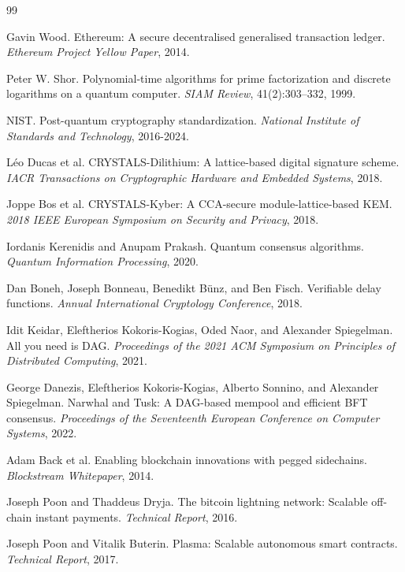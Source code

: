\documentclass[11pt]{article}
\begin{document}

\begin{thebibliography}{99}

Gavin Wood.
\newblock Ethereum: A secure decentralised generalised transaction ledger.
\newblock \emph{Ethereum Project Yellow Paper}, 2014.

Peter W. Shor.
\newblock Polynomial-time algorithms for prime factorization and discrete logarithms on a quantum computer.
\newblock \emph{SIAM Review}, 41(2):303--332, 1999.

NIST.
\newblock Post-quantum cryptography standardization.
\newblock \emph{National Institute of Standards and Technology}, 2016-2024.

Léo Ducas et al.
\newblock CRYSTALS-Dilithium: A lattice-based digital signature scheme.
\newblock \emph{IACR Transactions on Cryptographic Hardware and Embedded Systems}, 2018.

Joppe Bos et al.
\newblock CRYSTALS-Kyber: A CCA-secure module-lattice-based KEM.
\newblock \emph{2018 IEEE European Symposium on Security and Privacy}, 2018.

Iordanis Kerenidis and Anupam Prakash.
\newblock Quantum consensus algorithms.
\newblock \emph{Quantum Information Processing}, 2020.

Dan Boneh, Joseph Bonneau, Benedikt Bünz, and Ben Fisch.
\newblock Verifiable delay functions.
\newblock \emph{Annual International Cryptology Conference}, 2018.

Idit Keidar, Eleftherios Kokoris-Kogias, Oded Naor, and Alexander Spiegelman.
\newblock All you need is DAG.
\newblock \emph{Proceedings of the 2021 ACM Symposium on Principles of Distributed Computing}, 2021.

George Danezis, Eleftherios Kokoris-Kogias, Alberto Sonnino, and Alexander Spiegelman.
\newblock Narwhal and Tusk: A DAG-based mempool and efficient BFT consensus.
\newblock \emph{Proceedings of the Seventeenth European Conference on Computer Systems}, 2022.

Adam Back et al.
\newblock Enabling blockchain innovations with pegged sidechains.
\newblock \emph{Blockstream Whitepaper}, 2014.

Joseph Poon and Thaddeus Dryja.
\newblock The bitcoin lightning network: Scalable off-chain instant payments.
\newblock \emph{Technical Report}, 2016.

Joseph Poon and Vitalik Buterin.
\newblock Plasma: Scalable autonomous smart contracts.
\newblock \emph{Technical Report}, 2017.

\end{thebibliography}
\end{document}
